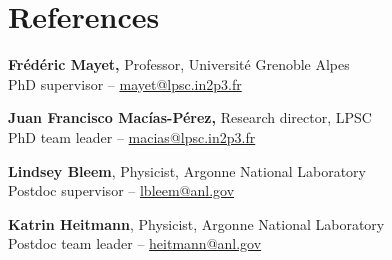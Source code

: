 \section{References}\label{references}

\textbf{Fr\'ed\'eric Mayet,}
    Professor, Universit\'e Grenoble Alpes \\
    PhD supervisor -- \url{mayet@lpsc.in2p3.fr}

\textbf{Juan Francisco Mac\'ias-P\'erez,}
    Research director, LPSC \\
    PhD team leader -- \url{macias@lpsc.in2p3.fr}

\textbf{Lindsey Bleem},
    Physicist, Argonne National Laboratory \\
    Postdoc supervisor -- \url{lbleem@anl.gov}

\textbf{Katrin Heitmann},
    Physicist, Argonne National Laboratory \\
    Postdoc team leader -- \url{heitmann@anl.gov}
